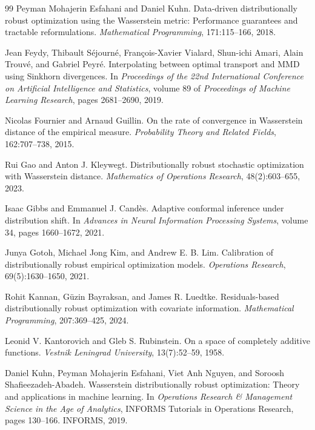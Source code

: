 \documentclass[11pt]{article}
\newcommand{\1}{\mathbf{1}}
\begin{document}
\begin{thebibliography}{99}
Peyman Mohajerin Esfahani and Daniel Kuhn.
\newblock Data-driven distributionally robust optimization using the Wasserstein metric: Performance guarantees and tractable reformulations.
\newblock \emph{Mathematical Programming}, 171:115--166, 2018.

Jean Feydy, Thibault S\'ejourn\'e, Fran\c{c}ois-Xavier Vialard, Shun-ichi Amari, Alain Trouv\'e, and Gabriel Peyr\'e.
\newblock Interpolating between optimal transport and {MMD} using Sinkhorn divergences.
\newblock In \emph{Proceedings of the 22nd International Conference on Artificial Intelligence and Statistics}, volume 89 of \emph{Proceedings of Machine Learning Research}, pages 2681--2690, 2019.

Nicolas Fournier and Arnaud Guillin.
\newblock On the rate of convergence in Wasserstein distance of the empirical measure.
\newblock \emph{Probability Theory and Related Fields}, 162:707--738, 2015.

Rui Gao and Anton J. Kleywegt.
\newblock Distributionally robust stochastic optimization with Wasserstein distance.
\newblock \emph{Mathematics of Operations Research}, 48(2):603--655, 2023.

Isaac Gibbs and Emmanuel J. Cand\`es.
\newblock Adaptive conformal inference under distribution shift.
\newblock In \emph{Advances in Neural Information Processing Systems}, volume 34, pages 1660--1672, 2021.

Junya Gotoh, Michael Jong Kim, and Andrew E. B. Lim.
\newblock Calibration of distributionally robust empirical optimization models.
\newblock \emph{Operations Research}, 69(5):1630--1650, 2021.

Rohit Kannan, G\"uzin Bayraksan, and James R. Luedtke.
\newblock Residuals-based distributionally robust optimization with covariate information.
\newblock \emph{Mathematical Programming}, 207:369--425, 2024.

Leonid V. Kantorovich and Gleb S. Rubinstein.
\newblock On a space of completely additive functions.
\newblock \emph{Vestnik Leningrad University}, 13(7):52--59, 1958.

Daniel Kuhn, Peyman Mohajerin Esfahani, Viet Anh Nguyen, and Soroosh Shafieezadeh-Abadeh.
\newblock Wasserstein distributionally robust optimization: Theory and applications in machine learning.
\newblock In \emph{Operations Research \& Management Science in the Age of Analytics}, INFORMS Tutorials in Operations Research, pages 130--166. INFORMS, 2019.


\end{thebibliography}
\end{document}
